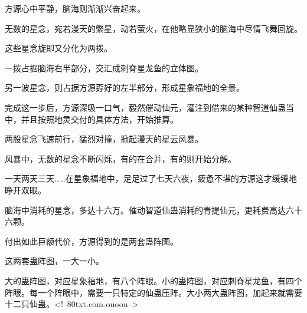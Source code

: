 \begin{this_body}
方源心中平静，脑海则渐渐兴奋起来。

无数的星念，宛若漫天的繁星，动若萤火，在他略显狭小的脑海中尽情飞舞回旋。

这些星念旋即又分化为两拨。

一拨占据脑海右半部分，交汇成刺脊星龙鱼的立体图。

另一波星念，则占据方源孬好的左半部分，形成星象福地的全景。

完成这一步后，方源深吸一口气，毅然催动仙元，灌注到借来的某种智道仙蛊当中，并且按照地灵交付的具体方法，开始推算。

两股星念飞速前行，猛烈对撞，掀起漫天的星云风暴。

风暴中，无数的星念不断闪烁，有的在合并，有的则开始分解。

一天两天三天……在星象福地中，足足过了七天六夜，疲惫不堪的方源这才缓缓地睁开双眼。

脑海中消耗的星念，多达十六万。催动智道仙蛊消耗的青提仙元，更耗费高达六十六颗。

付出如此巨额代价，方源得到的是两套蛊阵图。

这两套蛊阵图，一大一小。

大的蛊阵图，对应星象福地，有八个阵眼。小的蛊阵图，对应刺脊星龙鱼，有四个阵眼。每一个阵眼中，需要一只特定的仙蛊压阵。大小两大蛊阵图，加起来就需要十二只仙蛊。<!--80txt.com-ouoou-->

\end{this_body}

